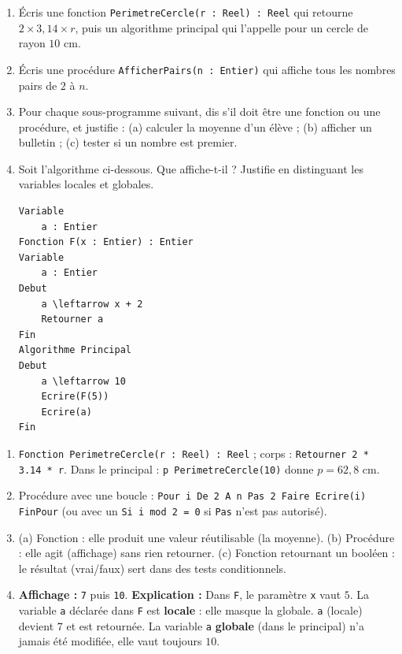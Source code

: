 \documentclass[11pt]{article}
\begin{document}
\begin{exercice}
\begin{enumerate}
  \item Écris une fonction \texttt{PerimetreCercle(r : Reel) : Reel} qui retourne $2 \times 3{,}14 \times r$, puis un algorithme principal qui l'appelle pour un cercle de rayon $10$ cm.
  \item Écris une procédure \texttt{AfficherPairs(n : Entier)} qui affiche tous les nombres pairs de $2$ à $n$.
  \item Pour chaque sous-programme suivant, dis s'il doit être une fonction ou une procédure, et justifie : (a) calculer la moyenne d'un élève ; (b) afficher un bulletin ; (c) tester si un nombre est premier.
  \item Soit l'algorithme ci-dessous. Que affiche-t-il ? Justifie en distinguant les variables locales et globales.
\begin{lstlisting}
Variable
    a : Entier
Fonction F(x : Entier) : Entier
Variable
    a : Entier
Debut
    a \leftarrow x + 2
    Retourner a
Fin
Algorithme Principal
Debut
    a \leftarrow 10
    Ecrire(F(5))
    Ecrire(a)
Fin
\end{lstlisting}
\end{enumerate}
\end{exercice}

\begin{corrige}[Exercice]
\begin{enumerate}
  \item \texttt{Fonction PerimetreCercle(r : Reel) : Reel} ; corps : \texttt{Retourner 2 * 3.14 * r}. Dans le principal : \texttt{p \leftarrow PerimetreCercle(10)} donne $p = 62{,}8$ cm.
  \item Procédure avec une boucle : \texttt{Pour i De 2 A n Pas 2 Faire Ecrire(i) FinPour} (ou avec un \texttt{Si i mod 2 = 0} si \texttt{Pas} n'est pas autorisé).
  \item (a) Fonction : elle produit une valeur réutilisable (la moyenne). (b) Procédure : elle agit (affichage) sans rien retourner. (c) Fonction retournant un booléen : le résultat (vrai/faux) sert dans des tests conditionnels.
  \item \textbf{Affichage :} \texttt{7} puis \texttt{10}.
  \textbf{Explication :} Dans \texttt{F}, le paramètre \texttt{x} vaut $5$. La variable \texttt{a} déclarée dans \texttt{F} est \textbf{locale} : elle masque la globale. \texttt{a} (locale) devient $7$ et est retournée. La variable \texttt{a} \textbf{globale} (dans le principal) n'a jamais été modifiée, elle vaut toujours $10$.
\end{enumerate}
\end{corrige}
\end{document}
